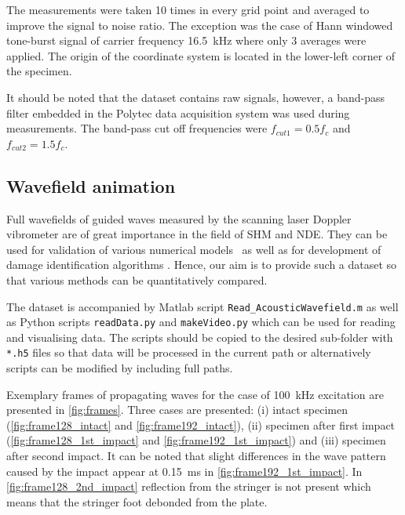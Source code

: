 \documentclass[times,final]{elsarticle}
\begin{document}
The measurements were taken \num{10} times in every grid point and averaged to improve the signal to noise ratio.
The exception was the case of Hann windowed tone-burst signal of carrier frequency \SI{16.5}{\kilo\hertz} where only \num{3} averages were applied.
The origin of the coordinate system is located in the lower-left corner of the specimen.

It should be noted that the dataset contains raw signals, however, a band-pass filter embedded in the Polytec data acquisition system was used during measurements.
The band-pass cut off frequencies were \(f_{cut1} = \num{0.5}f_c \) and \(f_{cut2} = \num{1.5}f_c \).

\subsection{Wavefield animation}
Full wavefields of guided waves measured by the scanning laser Doppler vibrometer are of great importance in the field of SHM and NDE. They can be used for validation of various numerical models~\cite{Shen2016,Kudela2020a} as well as for development of damage identification algorithms \cite{Radzienski2011,ROGGE2013,MESNIL2015,LUGOVTSOVA2021,Staszewski2012}. Hence, our aim is to provide such a dataset so that various methods can be quantitatively compared.

The dataset is accompanied by Matlab script \verb+Read_AcousticWavefield.m+ as well as Python scripts \verb+readData.py+ and \verb+makeVideo.py+ which can be used for reading and visualising data. The scripts should be copied to the desired sub-folder with \verb+*.h5+ files so that data will be processed in the current path or alternatively scripts can be modified by including full paths.

Exemplary frames of propagating waves for the case of \SI{100}{\kilo\hertz} excitation are presented in \autoref{fig:frames}.
Three cases are presented: (i) intact specimen (\autoref{fig:frame128_intact} and \autoref{fig:frame192_intact}), (ii) specimen after first impact (\autoref{fig:frame128_1st_impact} and \autoref{fig:frame192_1st_impact}) and (iii) specimen after second impact.
It can be noted that slight differences in the wave pattern caused by the impact appear at \SI{0.15}{\milli\second} in \autoref{fig:frame192_1st_impact}.
In \autoref{fig:frame128_2nd_impact} reflection from the stringer is not present which means that the stringer foot debonded from the plate.
\end{document}
